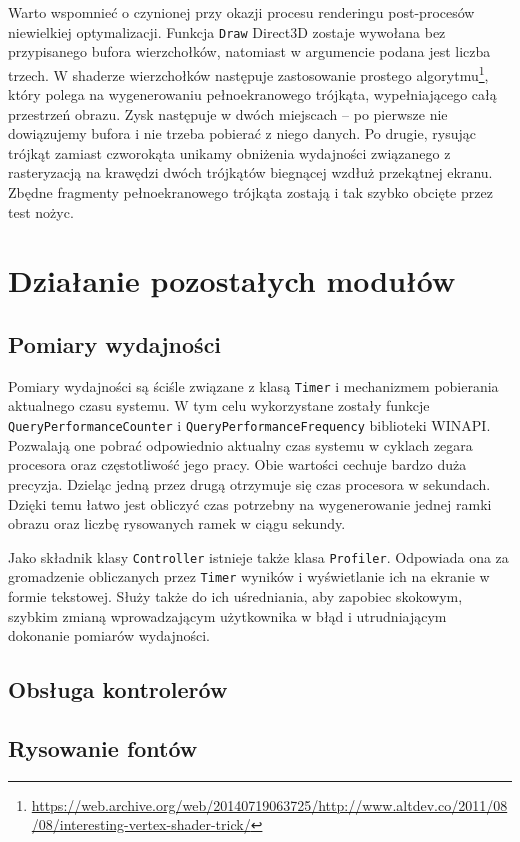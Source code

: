 		Warto wspomnieć o czynionej przy okazji procesu renderingu post-procesów niewielkiej optymalizacji. Funkcja \texttt{Draw} Direct3D zostaje wywołana bez przypisanego bufora wierzchołków, natomiast w argumencie podana jest liczba trzech. W shaderze wierzchołków następuje zastosowanie prostego algorytmu\footnote{\url{https://web.archive.org/web/20140719063725/http://www.altdev.co/2011/08/08/interesting-vertex-shader-trick/}}, który polega na wygenerowaniu pełnoekranowego trójkąta, wypełniającego całą przestrzeń obrazu. Zysk następuje w dwóch miejscach -- po pierwsze nie dowiązujemy bufora i nie trzeba pobierać z niego danych. Po drugie, rysując trójkąt zamiast czworokąta unikamy obniżenia wydajności związanego z rasteryzacją na krawędzi dwóch trójkątów biegnącej wzdłuż przekątnej ekranu. Zbędne fragmenty pełnoekranowego trójkąta zostają i tak szybko obcięte przez test nożyc.
	
	\section{Działanie pozostałych modułów}
	\label{t:budowa:inne}
	
		\subsection{Pomiary wydajności}
		\label{t:budowa:inne:profiling}
		
		
		Pomiary wydajności są ściśle związane z klasą \texttt{Timer} i mechanizmem pobierania aktualnego czasu systemu. W tym celu wykorzystane zostały funkcje \texttt{QueryPerformanceCounter} i \texttt{QueryPerformanceFrequency} biblioteki WINAPI. Pozwalają one pobrać odpowiednio aktualny czas systemu w cyklach zegara procesora oraz częstotliwość jego pracy. Obie wartości cechuje bardzo duża precyzja. Dzieląc jedną przez drugą otrzymuje się czas procesora w sekundach. Dzięki temu łatwo jest obliczyć czas potrzebny na wygenerowanie jednej ramki obrazu oraz liczbę rysowanych ramek w ciągu sekundy.
		
		Jako składnik klasy \texttt{Controller} istnieje także klasa \texttt{Profiler}. Odpowiada ona za gromadzenie obliczanych przez \texttt{Timer} wyników i wyświetlanie ich na ekranie w formie tekstowej. Służy także do ich uśredniania, aby zapobiec skokowym, szybkim zmianą wprowadzającym użytkownika w błąd i utrudniającym dokonanie pomiarów wydajności.
	
		\subsection{Obsługa kontrolerów}
		\label{t:budowa:inne:input}
		
		
		
		
		\subsection{Rysowanie fontów}
		\label{t:budowa:inne:fonty}
		
